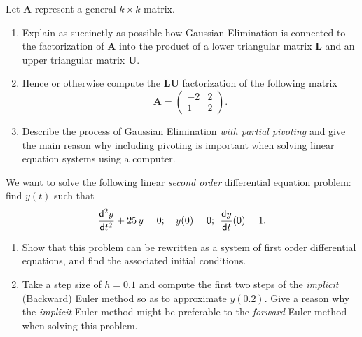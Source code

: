 \documentclass[12pt]{article}
\def\bA{\mathbf{A}}
\def\bL{\mathbf{L}}
\def\bU{\mathbf{U}}
\newcommand{\dif}{\mathsf{d}}
\begin{document}
\question
Let $\bA$ represent a general $k\times k$ matrix.
\begin{enumerate}
\item 
Explain as succinctly as possible how  Gaussian Elimination is connected to
the factorization of $\bA$ into the product of a lower triangular matrix  $\bL$
and an upper triangular matrix $\bU$.
 \null\vspace{-0.2cm}  

\item
Hence or otherwise compute the $\bL\bU$ factorization    of  the following matrix 
$$ \bA = \left( \begin{array}{cc} -2 &2  \\ 1 & 2 \end{array} \right). $$
\null\vspace{-0.6cm}
 \null\vspace{-0.2cm} 

 \item
Describe the process of    Gaussian Elimination  {\it with partial pivoting} and give the main reason
why including pivoting is  important when solving linear equation systems using 
a computer.
 \null\vspace{-0.2cm} 
\end{enumerate}

\medskip
\question 
We want to solve the following  linear  {\it  second order} differential equation
problem: find  $y(t)$ such that
$$
{\dif^2 y\over \dif t^2} + 25\,y =0 ; \quad y(0)=0; \>\> {\dif y\over \dif t} (0)=1.
$$

\begin{enumerate}
\item
Show that this problem can be rewritten  as a system of
first order differential equations, and find the associated initial conditions.
\null\vspace{-0.2cm} 

\item
 Take a  step size  of $h=0.1$  and 
compute the first two steps of the  {\it implicit} (Backward) Euler  method
 so as to approximate $y(0.2)$.  Give a reason why the {\it implicit} Euler 
 method might be preferable
 to the  {\it forward} Euler method when solving this problem.
 \null\vspace{-0.2cm} 
 
\end{enumerate}



\finished
\end{document}
